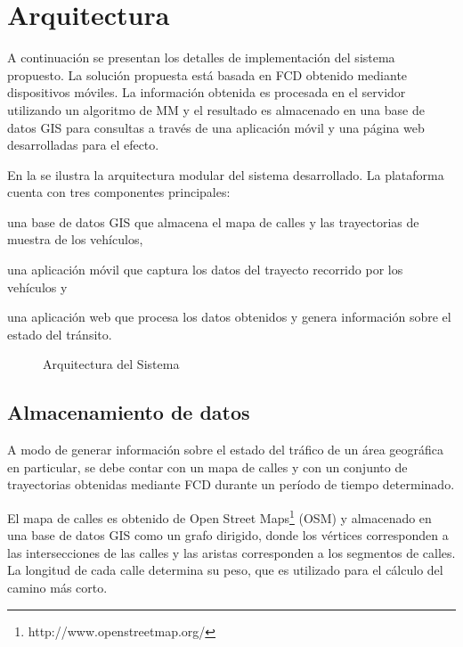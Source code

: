 \section{Arquitectura}
\label{sec:arquitectura}

A continuación se presentan los detalles de implementación del sistema propuesto. La solución propuesta está basada en FCD obtenido mediante dispositivos móviles. La información obtenida es procesada en el servidor utilizando un algoritmo de MM y el resultado es almacenado en una base de datos GIS para consultas a través de una aplicación móvil y una página web desarrolladas para el efecto.

En la  se ilustra la arquitectura modular del sistema desarrollado. La plataforma cuenta con tres componentes principales:
\begin{enumerate*}[1)] \item una base de datos GIS que almacena el mapa de calles y las trayectorias de muestra de los vehículos, \item una aplicación móvil que captura los datos del trayecto recorrido por los vehículos y \item una aplicación web que procesa los datos obtenidos y genera información sobre el estado del tránsito.  
\end{enumerate*}

\begin{figure}[h*]
	\centering
	
	\caption{\label{fig:arquitectura} Arquitectura del Sistema}	
\end{figure}

\subsection{Almacenamiento de datos}
\label{base-de-datos}

A modo de generar información sobre el estado del tráfico de un área geográfica en particular, se debe contar con un mapa de calles y con un conjunto de trayectorias obtenidas mediante FCD durante un período de tiempo determinado.

El mapa de calles es obtenido de Open Street Maps\footnote{http://www.openstreetmap.org/} (OSM) y almacenado en una base de datos GIS como un grafo dirigido, donde los vértices corresponden a las intersecciones de las calles y las aristas corresponden a los segmentos de calles. La longitud de cada calle determina su peso, que es utilizado para el cálculo del camino más corto.

